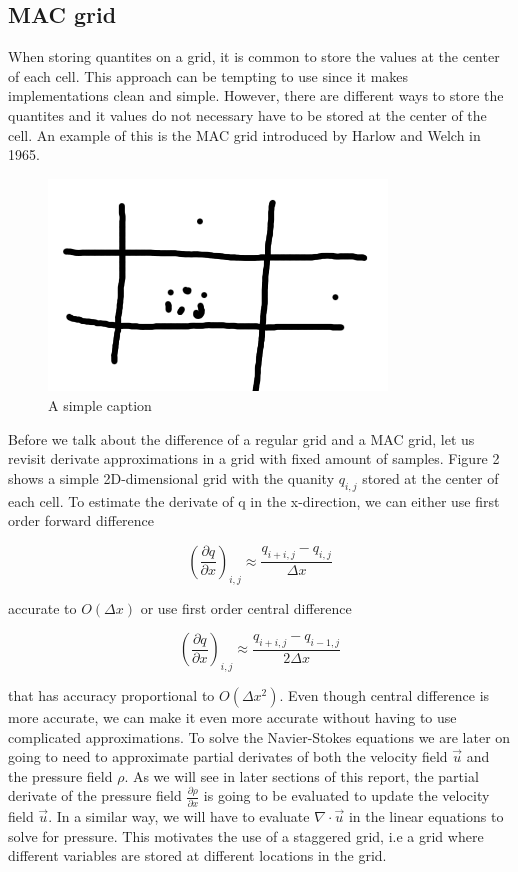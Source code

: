 \subsection{MAC grid}

When storing quantites on a grid, it is common to store the values at the center of each cell. This approach can be tempting to use since it makes implementations clean and simple. However, there are different ways to store the quantites and it values do not necessary have to be stored at the center of the cell. An example of this is the MAC grid introduced by Harlow and Welch in 1965.

\begin{figure}[ht!]
\centering
\includegraphics[width=90mm]{ch2/2d.png}
\caption{A simple caption}
\label{regulargrid}
\end{figure}

Before we talk about the difference of a regular grid and a MAC grid, let us revisit derivate approximations in a grid with fixed amount of samples. Figure 2 shows a simple 2D-dimensional grid with the quanity $q_{i,j}$ stored at the center of each cell. To estimate the derivate of q in the x-direction, we can either use first order forward difference 

\begin{equation}
(\frac{\partial q}{\partial x})_{i,j} \approx \frac{q_{i+i,j} - q_{i,j}}{\Delta x}
\end{equation}

accurate to $O(\Delta x)$ or use first order central difference

\begin{equation}
(\frac{\partial q}{\partial x})_{i,j} \approx \frac{q_{i+i,j} - q_{i-1,j}}{2\Delta x}
\label{centraldifference}
\end{equation}

that has accuracy proportional to $O(\Delta x^{2})$. Even though central difference is more accurate, we can make it even more accurate without having to use complicated approximations. To solve the Navier-Stokes equations we are later on going to need to approximate partial derivates of both the velocity field $\vec{u}$ and the pressure field $\rho$. As we will see in later sections of this report, the partial derivate of the pressure field $\frac{\partial \rho}{\partial x}$ is going to be evaluated to update the velocity field $\vec{u}$. In a similar way, we will have to evaluate $\nabla \cdot \vec{u}$ in the linear equations to solve for pressure. This motivates the use of a staggered grid, i.e a grid where different variables are stored at different locations in the grid.

